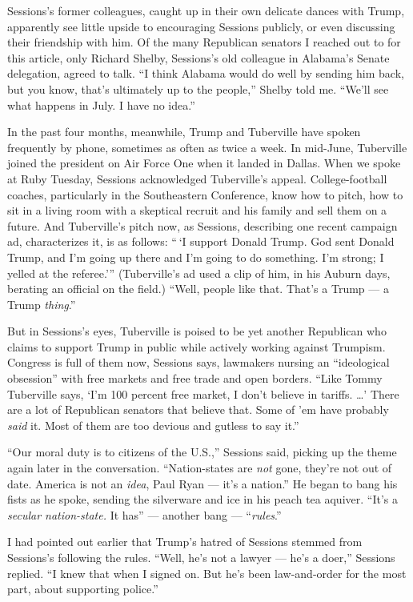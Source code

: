 Sessions's former colleagues, caught up in their own delicate dances
with Trump, apparently see little upside to encouraging Sessions
publicly, or even discussing their friendship with him. Of the many
Republican senators I reached out to for this article, only Richard
Shelby, Sessions's old colleague in Alabama's Senate delegation, agreed
to talk. ``I think Alabama would do well by sending him back, but you
know, that's ultimately up to the people,'' Shelby told me. ``We'll see
what happens in July. I have no idea.''

In the past four months, meanwhile, Trump and Tuberville have spoken
frequently by phone, sometimes as often as twice a week. In mid-June,
Tuberville joined the president on Air Force One when it landed in
Dallas. When we spoke at Ruby Tuesday, Sessions acknowledged
Tuberville's appeal. College-football coaches, particularly in the
Southeastern Conference, know how to pitch, how to sit in a living room
with a skeptical recruit and his family and sell them on a future. And
Tuberville's pitch now, as Sessions, describing one recent campaign ad,
characterizes it, is as follows: `` `I support Donald Trump. God sent
Donald Trump, and I'm going up there and I'm going to do something. I'm
strong; I yelled at the referee.''' (Tuberville's ad used a clip of him,
in his Auburn days, berating an official on the field.) ``Well, people
like that. That's a Trump --- a Trump \emph{thing}.''

But in Sessions's eyes, Tuberville is poised to be yet another
Republican who claims to support Trump in public while actively working
against Trumpism. Congress is full of them now, Sessions says, lawmakers
nursing an ``ideological obsession'' with free markets and free trade
and open borders. ``Like Tommy Tuberville says, `I'm 100 percent free
market, I don't believe in tariffs. \ldots{}' There are a lot of
Republican senators that believe that. Some of 'em have probably
\emph{said} it. Most of them are too devious and gutless to say it.''

``Our moral duty is to citizens of the U.S.,'' Sessions said, picking up
the theme again later in the conversation. ``Nation-states are
\emph{not} gone, they're not out of date. America is not an \emph{idea},
Paul Ryan --- it's a nation.'' He began to bang his fists as he spoke,
sending the silverware and ice in his peach tea aquiver. ``It's a
\emph{secular nation-state.} It has'' --- another bang ---
``\emph{rules}.''

I had pointed out earlier that Trump's hatred of Sessions stemmed from
Sessions's following the rules. ``Well, he's not a lawyer --- he's a
doer,'' Sessions replied. ``I knew that when I signed on. But he's been
law-and-order for the most part, about supporting police.''

